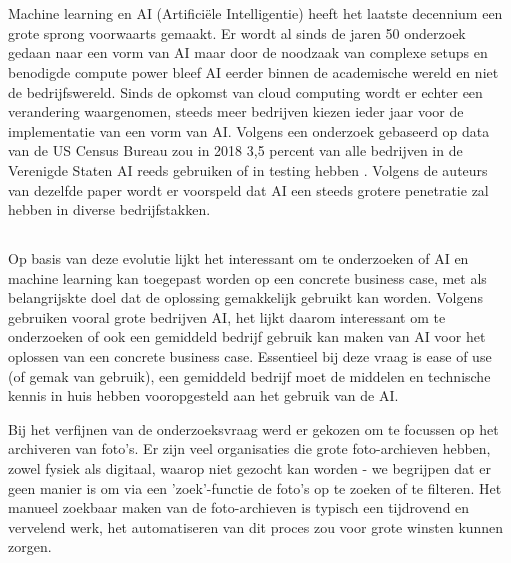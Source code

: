 
\chapter{}
\label{ch:inleiding}

Machine learning en AI (Artificiële Intelligentie) heeft het laatste decennium een grote sprong voorwaarts gemaakt. Er wordt al sinds de jaren 50 onderzoek gedaan naar een vorm van AI maar door de noodzaak van complexe setups en benodigde compute power bleef AI eerder binnen de academische wereld en niet de bedrijfswereld. Sinds de opkomst van cloud computing wordt er echter een verandering waargenomen, steeds meer bedrijven kiezen ieder jaar voor de implementatie van een vorm van AI. Volgens een onderzoek gebaseerd op data van de US Census Bureau zou in 2018 3,5 percent van alle bedrijven in de Verenigde Staten AI reeds gebruiken of in testing hebben \autocite{Zolas2020}. Volgens de auteurs van dezelfde paper wordt er voorspeld dat AI een steeds grotere penetratie zal hebben in diverse bedrijfstakken.

\section{}
\label{sec:probleemstelling}
Op basis van deze evolutie lijkt het interessant om te onderzoeken of AI en machine learning kan toegepast worden op een concrete business case, met als belangrijskte doel dat de oplossing gemakkelijk gebruikt kan worden. Volgens \textcite{Zolas2020} gebruiken vooral grote bedrijven AI, het lijkt daarom interessant om te onderzoeken of ook een gemiddeld bedrijf gebruik kan maken van AI voor het oplossen van een concrete business case. Essentieel bij deze vraag is ease of use (of gemak van gebruik), een gemiddeld bedrijf moet de middelen en technische kennis in huis hebben vooropgesteld aan het gebruik van de AI. 

Bij het verfijnen van de onderzoeksvraag werd er gekozen om te focussen op het archiveren van foto's. Er zijn veel organisaties die grote foto-archieven hebben, zowel fysiek als digitaal, waarop niet gezocht kan worden - we begrijpen dat er geen manier is om via een 'zoek'-functie de foto's op te zoeken of te filteren. Het manueel zoekbaar maken van de foto-archieven is typisch een tijdrovend en vervelend werk, het automatiseren van dit proces zou voor grote winsten kunnen zorgen.

